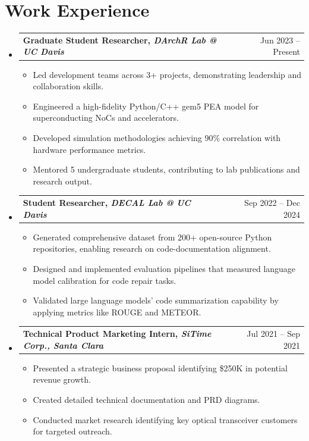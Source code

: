 \documentclass[letterpaper,10pt]{article}
\makeatletter
\newcommand{\resumeItem}[1]{\item\small{#1} \vspace{-3pt}}
\newcommand{\resumeSubheadingSmall}[2]{%
  \vspace{-1pt}\item
  \begin{tabular*}{0.97\textwidth}[t]{l@{\extracolsep{\fill}}r}
    \textbf{#1} & #2 \\
  \end{tabular*}\vspace{-7pt}}
\newcommand{\resumeSubHeadingList}{\begin{itemize}[leftmargin=0.15in, label={}, labelsep=0.15in]}
\newcommand{\resumeJustifiedList}{\begin{itemize}[leftmargin=0.3in, label=\textbullet, labelsep=0.1in]}
\newcommand{\resumeSubHeadingListEnd}{\end{itemize}}
\makeatother
\begin{document}
\section{Work Experience}
{\normalsize
\resumeSubHeadingList

  \resumeSubheadingSmall{Graduate Student Researcher, \textit{DArchR Lab @ UC Davis}}{Jun 2023 -- Present}
  \resumeJustifiedList
    \resumeItem{Led development teams across 3+ projects, demonstrating leadership and collaboration skills.}
    \resumeItem{Engineered a high-fidelity Python/C++ gem5 PEA model for superconducting NoCs and accelerators.}
    \resumeItem{Developed simulation methodologies achieving 90\% correlation with hardware performance metrics.}
    \resumeItem{Mentored 5 undergraduate students, contributing to lab publications and research output.}
  \end{itemize}

  \resumeSubheadingSmall{Student Researcher, \textit{DECAL Lab @ UC Davis}}{Sep 2022 -- Dec 2024}
  \resumeJustifiedList
    \resumeItem{Generated comprehensive dataset from 200+ open-source Python repositories, enabling research on code-documentation alignment.}
    \resumeItem{Designed and implemented evaluation pipelines that measured language model calibration for code repair tasks.}
    \resumeItem{Validated large language models' code summarization capability by applying metrics like ROUGE and METEOR.}
  \end{itemize}


  \resumeSubheadingSmall{Technical Product Marketing Intern, \textit{SiTime Corp., Santa Clara}}{Jul 2021 -- Sep 2021}
  \resumeJustifiedList
    \resumeItem{Presented a strategic business proposal identifying \$250K in potential revenue growth.}
    \resumeItem{Created detailed technical documentation and PRD diagrams.}
    \resumeItem{Conducted market research identifying key optical transceiver customers for targeted outreach.}
  \end{itemize}

\resumeSubHeadingListEnd
}
\end{document}
